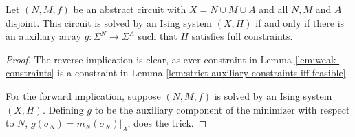 \documentclass{article}
\begin{document}
\begin{lem}\label{lem:full-constraints}
  Let $(N, M, f)$ be an abstract circuit with $X = N \cup M \cup A$ and all $N, M$ and $A$ disjoint. This circuit is solved by an Ising system $(X, H)$ if and only if there is an auxiliary array $g:\Sigma^N \to \Sigma^A$ such that $H$ satisfies full constraints.
\end{lem}
\begin{proof}
  The reverse implication is clear, as ever constraint in Lemma \ref{lem:weak-constraints} is a constraint in Lemma \ref{lem:strict-auxiliary-constraints-iff-feasible}. 

  For the forward implication, suppose $(N,M,f)$ is solved by an Ising system $(X,H)$. Defining $g$ to be the auxiliary component of the minimizer with respect to $N$, $g(\sigma_N) = m_N(\sigma_N)|_{A}$, does the trick.
\end{proof}
\end{document}
